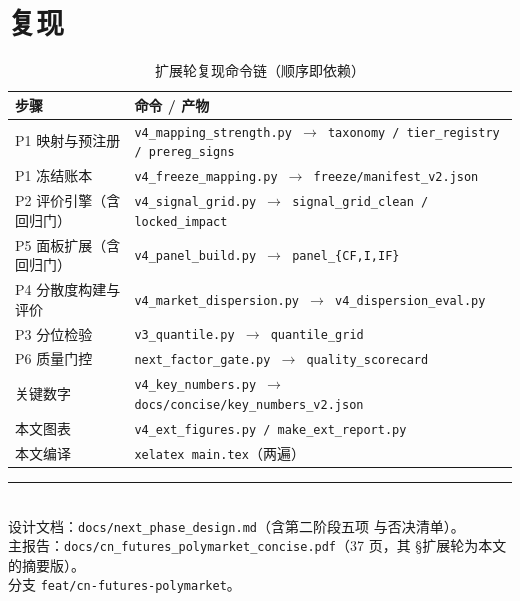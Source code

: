 \documentclass[11pt, a4paper]{ctexart}
\newcommand{\code}[1]{\texttt{\small #1}}
\begin{document}
\section{复现}

\begin{table}[h!]\centering\small
\caption{扩展轮复现命令链（顺序即依赖）}
\begin{tabular}{p{5.6cm}p{7.8cm}}
\toprule
步骤 & 命令 / 产物 \\
\midrule
P1 映射与预注册 & \code{v4\_mapping\_strength.py $\to$
  taxonomy / tier\_registry / prereg\_signs} \\
P1 冻结账本 & \code{v4\_freeze\_mapping.py $\to$
  freeze/manifest\_v2.json} \\
P2 评价引擎（含回归门） & \code{v4\_signal\_grid.py $\to$
  signal\_grid\_clean / locked\_impact} \\
P5 面板扩展（含回归门） & \code{v4\_panel\_build.py $\to$
  panel\_\{CF,I,IF\}} \\
P4 分散度构建与评价 & \code{v4\_market\_dispersion.py $\to$
  v4\_dispersion\_eval.py} \\
P3 分位检验 & \code{v3\_quantile.py $\to$ quantile\_grid} \\
P6 质量门控 & \code{next\_factor\_gate.py $\to$ quality\_scorecard} \\
关键数字 & \code{v4\_key\_numbers.py $\to$
  docs/concise/key\_numbers\_v2.json} \\
本文图表 & \code{v4\_ext\_figures.py / make\_ext\_report.py} \\
本文编译 & \code{xelatex main.tex}（两遍） \\
\bottomrule
\end{tabular}
\end{table}

\vspace{1em}
\noindent\rule{\textwidth}{0.4pt}\\
\small 设计文档：\code{docs/next\_phase\_design.md}（含第二阶段五项
与否决清单）。\\
主报告：\code{docs/cn\_futures\_polymarket\_concise.pdf}（37 页，其
§扩展轮为本文的摘要版）。\\
分支 \code{feat/cn-futures-polymarket}。
\end{document}
